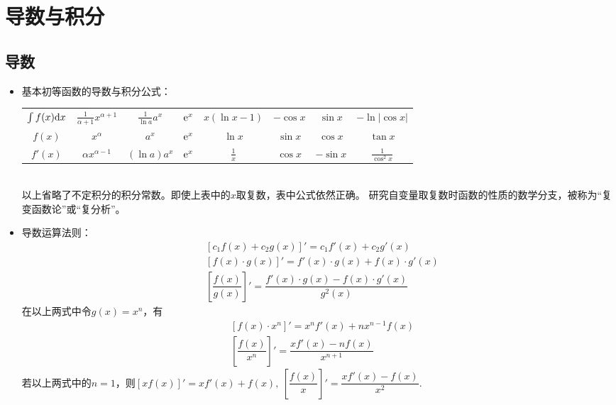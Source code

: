\chapter{导数与积分}

\section{导数}
\begin{itemize}[leftmargin=\inteval{\myitemleftmargin}pt,itemsep=
   \inteval{\myitemitempsep}pt,topsep=\inteval{\myitemtopsep}pt]
\item 基本初等函数的导数与积分公式：
\begin{table}[h]
\centering
\begin{tabular}{c|c|c|c|c|c|c|c}
    \hline
    $ \int f(x)\mathrm{d} x $& $ \frac{1}{\alpha+1}x^{\alpha+1} $ & $ \frac{1}{\ln a}a^x $ &
    $ \mathrm{e}^x $ & $ x(\ln x-1) $ & $ -\cos x $ & $ \sin x $ & $  -\ln|\cos x| $ \\
    $ f(x) $ & $ x^{\alpha} $ & $ a^x $ & $ \mathrm{e}^x $ & $ \ln x $ & $ \sin x $ & 
    $ \cos  x $ & $ \tan x $ \\
    $ f'(x) $ & $ \alpha x^{\alpha-1} $ & $ (\ln a) a^x $ & $ \mathrm{e}^x $ & 
    $ \frac{1}{x} $ & $ \cos x $ & $ -\sin x $ & $ \frac{1}{\cos ^2 x} $ \\
    \hline
\end{tabular}
\end{table} \\
以上省略了不定积分的积分常数。即使上表中的$ x $取复数，表中公式依然正确。
研究自变量取复数时函数的性质的数学分支，被称为“复变函数论”或“复分析”。

\item 导数运算法则：
\begin{align*}
    & \left[c_1f(x)+c_2g(x)\right]'=c_1f'(x)+c_2g'(x) \\
    & \left[f(x)\cdot g(x) \right]'= f'(x)\cdot g(x)+f(x)\cdot g'(x) \\
    & \left[ \dfrac{f(x)}{g(x)}\right]' =\dfrac{f'(x)\cdot g(x)-f(x)\cdot g'(x)}{g^2(x)}
\end{align*}
在以上两式中令$ g(x)=x^n $，有
\begin{align*}
	& \left[f(x)\cdot x^n \right]'= x^n f'(x)+nx^{n-1}f(x) \\
	& \left[ \dfrac{f(x)}{x^n}\right]' =\dfrac{xf'(x)-nf(x)}{x^{n+1}}
\end{align*}
若以上两式中的$ n=1 $，则$ [xf(x)]'=xf'(x)+f(x),\ \left[ \dfrac{f(x)}{x}\right]'=\dfrac{xf'(x)-f(x)}{x^{2}} $.\\ 


\end{itemize}
